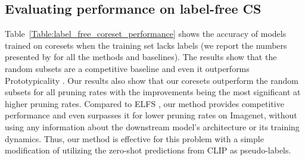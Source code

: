 \subsection{Evaluating performance on label-free CS}
Table~\ref{Table:label_free_coreset_performance} shows the accuracy of models trained on coresets when the training set lacks labels 
(we report the numbers presented by \cite{zheng2024elfs} for all the methods and baselines). 
The results show that the random subsets are a competitive baseline and even it outperforms Prototypicality \cite{sorscher2022beyond}.
Our results also show that our coresets outperform the random subsets for all pruning rates with the improvements being the most significant at higher pruning rates.
Compared to ELFS \cite{zheng2024elfs}, our method provides competitive performance and even surpasses it for lower pruning rates on Imagenet, without using any information about the downstream model's architecture or its training dynamics. %
Thus, our method is effective for this problem with a simple modification of utilizing the zero-shot predictions from CLIP as pseudo-labels. %




